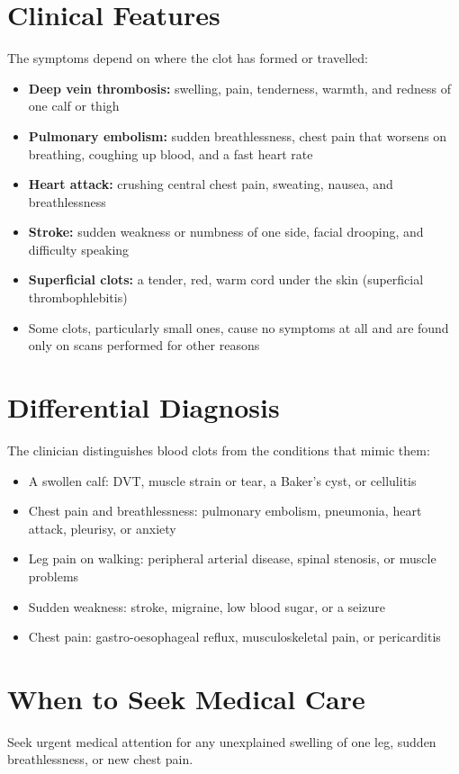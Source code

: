 \section*{Clinical Features}
The symptoms depend on where the clot has formed or travelled:

\begin{itemize}
    \item \textbf{Deep vein thrombosis:} swelling, pain, tenderness, warmth, and redness of one calf or thigh
    \item \textbf{Pulmonary embolism:} sudden breathlessness, chest pain that worsens on breathing, coughing up blood, and a fast heart rate
    \item \textbf{Heart attack:} crushing central chest pain, sweating, nausea, and breathlessness
    \item \textbf{Stroke:} sudden weakness or numbness of one side, facial drooping, and difficulty speaking
    \item \textbf{Superficial clots:} a tender, red, warm cord under the skin (superficial thrombophlebitis)
    \item Some clots, particularly small ones, cause no symptoms at all and are found only on scans performed for other reasons
\end{itemize}

\section*{Differential Diagnosis}
The clinician distinguishes blood clots from the conditions that mimic them:

\begin{itemize}
    \item A swollen calf: DVT, muscle strain or tear, a Baker's cyst, or cellulitis
    \item Chest pain and breathlessness: pulmonary embolism, pneumonia, heart attack, pleurisy, or anxiety
    \item Leg pain on walking: peripheral arterial disease, spinal stenosis, or muscle problems
    \item Sudden weakness: stroke, migraine, low blood sugar, or a seizure
    \item Chest pain: gastro-oesophageal reflux, musculoskeletal pain, or pericarditis
\end{itemize}

\section*{When to Seek Medical Care}
Seek urgent medical attention for any unexplained swelling of one leg, sudden breathlessness, or new chest pain.

